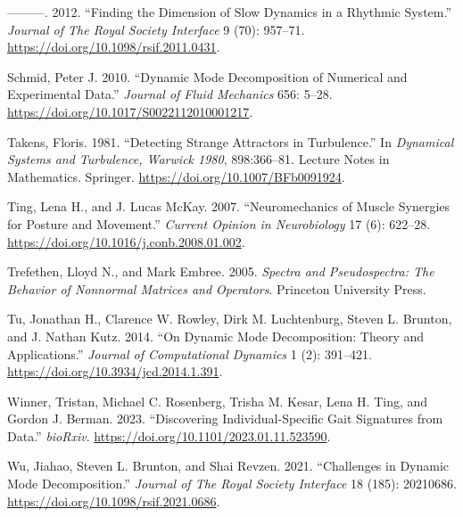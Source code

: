 \documentclass[
  letterpaper,
  DIV=11,
  numbers=noendperiod]{scrartcl}
\newlength{\cslhangindent}
\newenvironment{CSLReferences}[2] %
 {\begin{list}{}{%
  \setlength{\itemindent}{0pt}
  \setlength{\leftmargin}{0pt}
  \setlength{\parsep}{0pt}
  \ifodd #1
   \setlength{\leftmargin}{\cslhangindent}
   \setlength{\itemindent}{-1\cslhangindent}
  \fi
  \setlength{\itemsep}{#2\baselineskip}}}
 {\end{list}}
\begin{document}
\begin{CSLReferences}{1}{0}
---------. 2012. {``Finding the Dimension of Slow Dynamics in a Rhythmic
System.''} \emph{Journal of The Royal Society Interface} 9 (70):
957--71. \url{https://doi.org/10.1098/rsif.2011.0431}.

Schmid, Peter J. 2010. {``Dynamic Mode Decomposition of Numerical and
Experimental Data.''} \emph{Journal of Fluid Mechanics} 656: 5--28.
\url{https://doi.org/10.1017/S0022112010001217}.

Takens, Floris. 1981. {``Detecting Strange Attractors in Turbulence.''}
In \emph{Dynamical Systems and Turbulence, Warwick 1980}, 898:366--81.
Lecture Notes in Mathematics. Springer.
\url{https://doi.org/10.1007/BFb0091924}.

Ting, Lena H., and J. Lucas McKay. 2007. {``Neuromechanics of Muscle
Synergies for Posture and Movement.''} \emph{Current Opinion in
Neurobiology} 17 (6): 622--28.
\url{https://doi.org/10.1016/j.conb.2008.01.002}.

Trefethen, Lloyd N., and Mark Embree. 2005. \emph{Spectra and
Pseudospectra: The Behavior of Nonnormal Matrices and Operators}.
Princeton University Press.

Tu, Jonathan H., Clarence W. Rowley, Dirk M. Luchtenburg, Steven L.
Brunton, and J. Nathan Kutz. 2014. {``On {Dynamic} {Mode}
{Decomposition}: {Theory} and {Applications}.''} \emph{Journal of
Computational Dynamics} 1 (2): 391--421.
\url{https://doi.org/10.3934/jcd.2014.1.391}.

Winner, Tristan, Michael C. Rosenberg, Trisha M. Kesar, Lena H. Ting,
and Gordon J. Berman. 2023. {``Discovering Individual-Specific Gait
Signatures from Data.''} \emph{bioRxiv}.
\url{https://doi.org/10.1101/2023.01.11.523590}.

Wu, Jiahao, Steven L. Brunton, and Shai Revzen. 2021. {``Challenges in
{Dynamic} {Mode} {Decomposition}.''} \emph{Journal of The Royal Society
Interface} 18 (185): 20210686.
\url{https://doi.org/10.1098/rsif.2021.0686}.

\end{CSLReferences}
\end{document}
